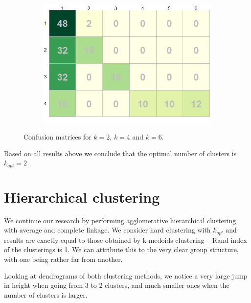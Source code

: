 \documentclass[12pt]{article}
\begin{document}
\begin{figure}[h!]
\begin{subfigure}[b]{0.33\linewidth}
   \caption{}\label{fig:confMat_4}
  \end{subfigure}%
  \begin{subfigure}[b]{0.33\linewidth}
    \centering
 \includegraphics[width=\textwidth]{../images/project2/confMat_6.png}
 \caption{}\label{fig:confMat_6}
\end{subfigure}%
\caption{Confusion matrices for $k=2$, $k=4$ and $k=6$.}
\label{fig:confMat}
\end{figure}

Based on all results above we conclude that the optimal number of clusters is $k_{opt} = 2$ .

\section{Hierarchical clustering}

We continue our research by performing agglomerative hierarchical clustering with average and complete linkage. We consider hard clustering with $k_{opt}$ 
and results are exactly equal to those obtained by k-medoids clustering -- Rand index of the clusterings is 1.
We can attribute this to the very clear group structure, with one being rather far from another.

Looking at dendrograms of both clustering methods, we notice a very large jump in height when going from 3 to 2 clusters, and much smaller ones 
when the number of clusters is larger.
\end{document}
